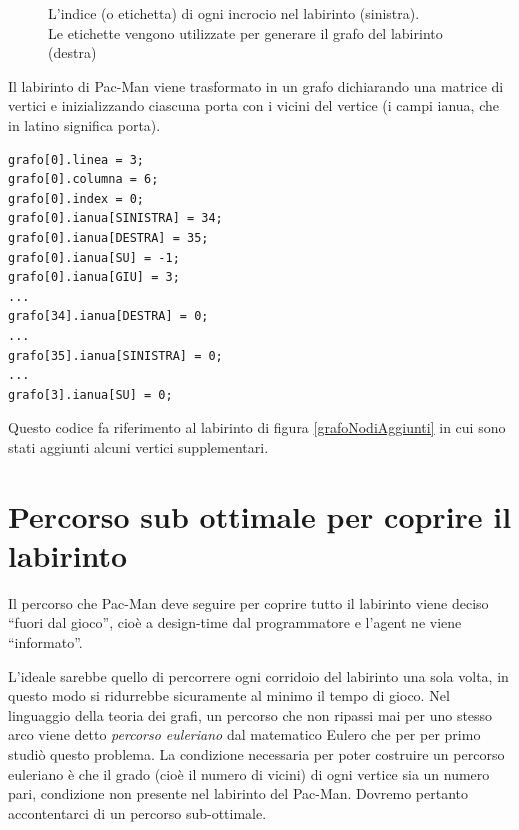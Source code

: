 \documentclass[8pt]{book}
\begin{document}
\begin{figure}
\begin{subfigure}[b]{0.49\textwidth}
    \label{graf}
  \end{subfigure}
  \label{grafoELabirinto}
  \caption{L'indice (o etichetta) di ogni incrocio nel labirinto (sinistra).\\Le etichette vengono utilizzate per generare il grafo del labirinto (destra)}
\end{figure}

Il labirinto di Pac-Man viene trasformato in un grafo dichiarando una matrice di vertici e inizializzando ciascuna porta con i vicini del vertice (i campi ianua, che in latino significa porta).

\begin{spacing}{0.9}
  \begin{small}
    \begin{tcolorbox}
\begin{verbatim}
grafo[0].linea = 3;
grafo[0].columna = 6;
grafo[0].index = 0;
grafo[0].ianua[SINISTRA] = 34;
grafo[0].ianua[DESTRA] = 35;
grafo[0].ianua[SU] = -1;
grafo[0].ianua[GIU] = 3;
...
grafo[34].ianua[DESTRA] = 0;
...
grafo[35].ianua[SINISTRA] = 0;
...
grafo[3].ianua[SU] = 0;
\end{verbatim}
  \end{tcolorbox}
    \end{small}
      \end{spacing}
    
    Questo codice fa riferimento al labirinto di figura \ref{grafoNodiAggiunti} in cui sono stati aggiunti alcuni vertici supplementari.

\section[Percorso sub ottimale]{Percorso sub ottimale per coprire il labirinto}\label{tocux5f52}

Il percorso che Pac-Man deve seguire per coprire tutto il labirinto viene deciso ``fuori dal gioco'', cioè a design-time dal programmatore e l'agent ne viene ``informato''.

L'ideale sarebbe quello di percorrere ogni corridoio del labirinto una sola volta, in questo modo si ridurrebbe sicuramente al minimo il tempo di gioco. Nel linguaggio della teoria dei grafi, un percorso che non ripassi mai per uno stesso arco viene detto \emph{percorso euleriano} dal matematico Eulero che per per primo studiò questo problema. La condizione necessaria per poter costruire un percorso euleriano è che il grado (cioè il numero di vicini) di ogni vertice sia un numero pari, condizione non presente nel labirinto del Pac-Man. Dovremo pertanto accontentarci di un percorso sub-ottimale.\\
\end{document}
